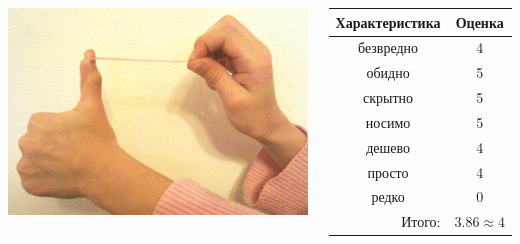 \begin{frame} %
    \begin{columns}
            \begin{center}
                \includegraphics[width=\textwidth]{fig/elastic}
            \end{center}
            
            \begin{center}
                \begin{tabular}{c|c}
                    \hline\hline
                    Характеристика              & Оценка\\ \hline\hline
                    безвредно                   & 4 \\
                    обидно                      & 5 \\
                    скрытно                     & 5 \\
                    носимо                      & 5 \\
                    дешево                      & 4 \\
                    просто                      & 4 \\ 
                    редко                       & 0 \\ \hline
                    \multicolumn{1}{r|}{Итого:} & $3.86\approx 4$ \\
                \end{tabular}
            \end{center}
    \end{columns}    
\end{frame}

